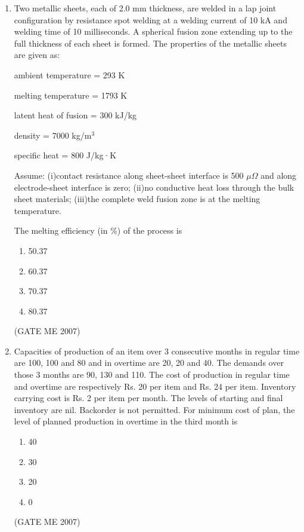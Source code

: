 \documentclass[journal]{IEEEtran}
\begin{document}
\begin{enumerate}
\item Two metallic sheets, each of 2.0 mm thickness, are welded in a lap joint configuration by resistance spot welding at a welding current of 10 kA and welding time of 10 milliseconds. A spherical fusion zone extending up to the full thickness of each sheet is formed. The properties of the metallic sheets are given as:

ambient temperature = 293 K

melting temperature = 1793 K

latent heat of fusion = 300 kJ/kg

density = 7000 kg/m$^3$

specific heat = 800 J/kg·K

Assume:
(i)contact resistance along sheet-sheet interface is 500 $ \mu\Omega $ and along electrode-sheet interface is zero;
(ii)no conductive heat loss through the bulk sheet materials;
(iii)the complete weld fusion zone is at the melting temperature.

The melting efficiency (in \%) of the process is
\begin{multicols}{4}
\begin{enumerate}
\item 50.37
\item 60.37
\item 70.37
\item 80.37
\end{enumerate}
\end{multicols}
\hfill (GATE ME 2007)

\item Capacities of production of an item over 3 consecutive months in regular time are 100, 100 and 80 and in overtime are 20, 20 and 40. The demands over those 3 months are 90, 130 and 110. The cost of production in regular time and overtime are respectively Rs. 20 per item and Rs. 24 per item. Inventory carrying cost is Rs. 2 per item per month. The levels of starting and final inventory are nil. Backorder is not permitted. For minimum cost of plan, the level of planned production in overtime in the third month is
\begin{multicols}{4}
\begin{enumerate}
\item 40
\item 30
\item 20
\item 0
\end{enumerate}
\end{multicols}
\hfill (GATE ME 2007)


\end{enumerate}
\end{document}
